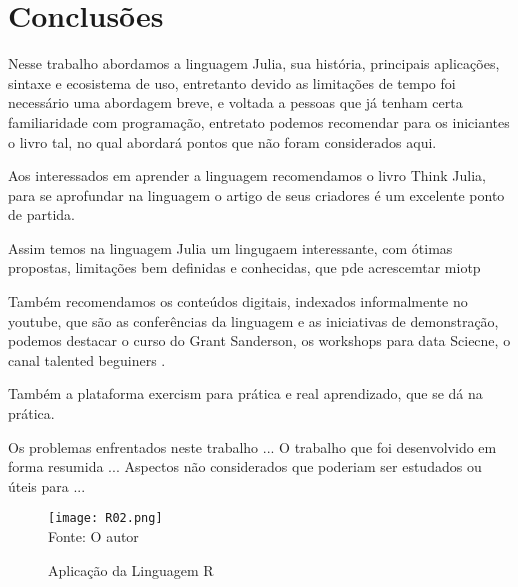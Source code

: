 %



\chapter{Conclus\~{o}es}

Nesse trabalho abordamos a linguagem Julia, sua história, principais aplicações, sintaxe e ecosistema de uso, entretanto devido as limitações de tempo foi necessário uma abordagem breve, e voltada a pessoas que já tenham certa familiaridade com programação, entretato podemos recomendar para os iniciantes o livro tal, no qual abordará pontos que não foram considerados aqui.

Aos interessados em aprender a linguagem recomendamos o livro Think Julia, para se aprofundar na linguagem o artigo de seus criadores é um excelente ponto de partida. 

Assim temos na linguagem Julia um lingugaem interessante, com ótimas propostas, limitações bem definidas e conhecidas, que pde acrescemtar miotp 

Também recomendamos os conteúdos digitais, indexados informalmente no youtube, que são as conferências da linguagem e as iniciativas de demonstração, podemos destacar o curso do Grant Sanderson, os workshops para data Sciecne, o canal talented beguiners .

Também a plataforma exercism para prática e real aprendizado, que se dá na prática.




Os problemas enfrentados neste trabalho ...
O trabalho que foi desenvolvido em forma resumida ...
Aspectos n\~{a}o considerados que poderiam ser estudados ou \'{u}teis para ...



   \begin{figure}[H]
    \begin{center}
        \caption{Aplica\c{c}\~{a}o da Linguagem R} \label{ling2}
        \texttt{[image: R02.png]} \\
        {\tiny \sf Fonte: O autor }
    \end{center}
   \end{figure} 
